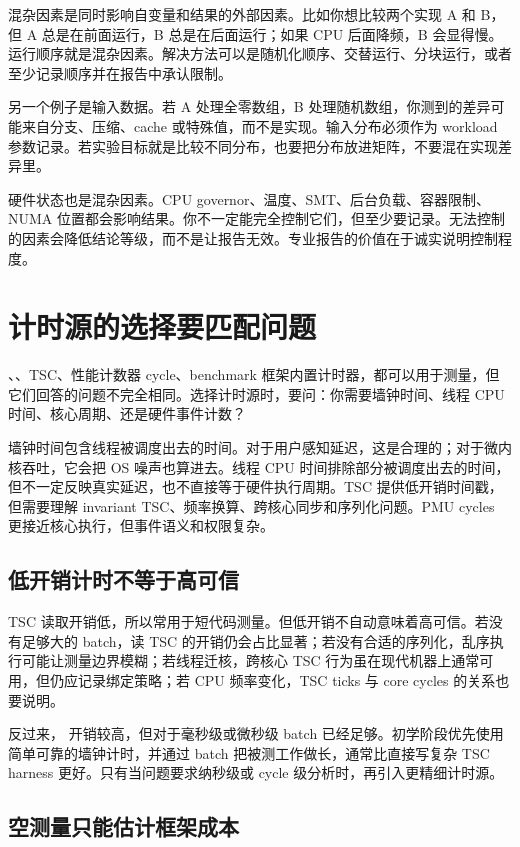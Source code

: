 混杂因素是同时影响自变量和结果的外部因素。比如你想比较两个实现 A 和 B，但 A 总是在前面运行，B 总是在后面运行；如果 CPU 后面降频，B 会显得慢。运行顺序就是混杂因素。解决方法可以是随机化顺序、交替运行、分块运行，或者至少记录顺序并在报告中承认限制。

另一个例子是输入数据。若 A 处理全零数组，B 处理随机数组，你测到的差异可能来自分支、压缩、cache 或特殊值，而不是实现。输入分布必须作为 workload 参数记录。若实验目标就是比较不同分布，也要把分布放进矩阵，不要混在实现差异里。

硬件状态也是混杂因素。CPU governor、温度、SMT、后台负载、容器限制、NUMA 位置都会影响结果。你不一定能完全控制它们，但至少要记录。无法控制的因素会降低结论等级，而不是让报告无效。专业报告的价值在于诚实说明控制程度。

\section{计时源的选择要匹配问题}

、、TSC、性能计数器 cycle、benchmark 框架内置计时器，都可以用于测量，但它们回答的问题不完全相同。选择计时源时，要问：你需要墙钟时间、线程 CPU 时间、核心周期、还是硬件事件计数？

墙钟时间包含线程被调度出去的时间。对于用户感知延迟，这是合理的；对于微内核吞吐，它会把 OS 噪声也算进去。线程 CPU 时间排除部分被调度出去的时间，但不一定反映真实延迟，也不直接等于硬件执行周期。TSC 提供低开销时间戳，但需要理解 invariant TSC、频率换算、跨核心同步和序列化问题。PMU cycles 更接近核心执行，但事件语义和权限复杂。

\subsection{低开销计时不等于高可信}

TSC 读取开销低，所以常用于短代码测量。但低开销不自动意味着高可信。若没有足够大的 batch，读 TSC 的开销仍会占比显著；若没有合适的序列化，乱序执行可能让测量边界模糊；若线程迁核，跨核心 TSC 行为虽在现代机器上通常可用，但仍应记录绑定策略；若 CPU 频率变化，TSC ticks 与 core cycles 的关系也要说明。

反过来， 开销较高，但对于毫秒级或微秒级 batch 已经足够。初学阶段优先使用简单可靠的墙钟计时，并通过 batch 把被测工作做长，通常比直接写复杂 TSC harness 更好。只有当问题要求纳秒级或 cycle 级分析时，再引入更精细计时源。

\subsection{空测量只能估计框架成本}

